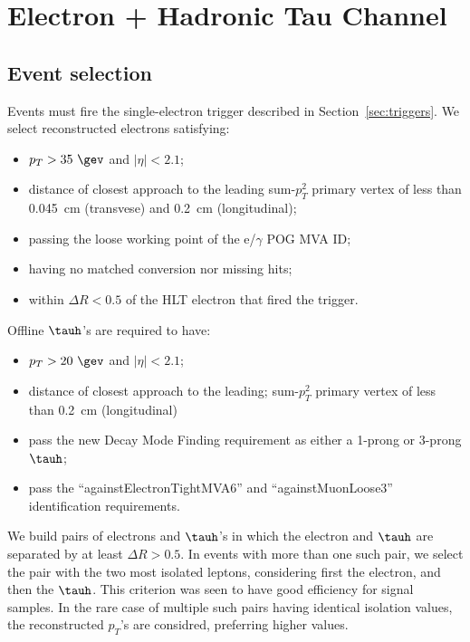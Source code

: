 \section{Electron + Hadronic Tau Channel}\label{sec:eTauhad}

\subsection{Event selection}\label{sec:et_selection}

Events must fire the single-electron trigger described in
Section~\ref{sec:triggers}.  We select reconstructed electrons
satisfying:
\begin{itemize}
  \item $p_T>35~\gev$ and $\vert\eta\vert<2.1$;
  \item distance of closest approach to the leading 
sum-$p_T^2$ primary vertex of less than 0.045~cm 
(transvese) and 0.2~cm (longitudinal);
  \item passing the loose working point of the e/$\gamma$
POG MVA ID;
  \item having no matched conversion nor missing hits;
  \item within $\Delta R<0.5$ of the HLT electron that fired the trigger.

\end{itemize}

Offline $\tauh$'s are required to have:
\begin{itemize}
  \item $p_{T}> 20~\gev$ and $\vert \eta \vert < 2.1$;
  \item distance of closest approach to the leading;
sum-$p_T^2$ primary vertex of less than 0.2~cm (longitudinal)
  \item pass the new Decay Mode Finding requirement as 
either a 1-prong or 3-prong $\tauh$;
  \item pass the ``againstElectronTightMVA6'' and
``againstMuonLoose3'' identification requirements.
\end{itemize}

We build pairs of electrons and $\tauh$'s in which the electron and
$\tauh$ are separated by at least $\Delta R > 0.5$.  In events with
more than one such pair, we select the pair with the two most isolated
leptons, considering first the electron, and then the $\tauh$.  This
criterion was seen to have good efficiency for signal samples.  In the
rare case of multiple such pairs having identical isolation values,
the reconstructed $p_T$'s are considred, preferring higher values.

